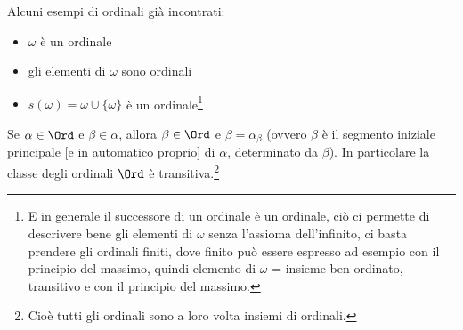 \documentclass[11pt]{scrartcl}
\begin{document}
\begin{example}
	Alcuni esempi di ordinali già incontrati:
	\begin{itemize}
		\item $\omega$ è un ordinale
		\item gli elementi di $\omega$ sono ordinali
		\item $s(\omega) = \omega \cup \{\omega\}$ è un ordinale\footnote{E in generale il successore di un ordinale è un ordinale, ciò ci permette di descrivere bene gli elementi di $\omega$ senza l'assioma dell'infinito, ci basta prendere gli ordinali finiti, dove finito può essere espresso ad esempio con il principio del massimo,
		quindi elemento di $\omega$ = insieme ben ordinato, transitivo e con il principio del massimo.}
	\end{itemize}
\end{example}

\begin{remark}
	Se $\alpha \in \Ord$ e $\beta \in \alpha$, allora $\beta \in \Ord$ e $\beta = \alpha_\beta$ (ovvero $\beta$ è il segmento iniziale principale [e in automatico proprio] di $\alpha$, determinato da $\beta$). In particolare la classe degli ordinali $\Ord$ è transitiva.\footnote{Cioè tutti gli ordinali sono a loro volta insiemi di ordinali.}
\end{remark}
\end{document}
